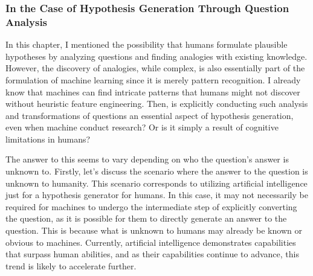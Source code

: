 \documentclass{article}
\begin{document}


\subsubsection{In the Case of Hypothesis Generation Through Question Analysis}

In this chapter, I mentioned the possibility that humans formulate plausible hypotheses by analyzing questions and finding analogies with existing knowledge. However, the discovery of analogies, while complex, is also essentially part of the formulation of machine learning since it is merely pattern recognition. I already know that machines can find intricate patterns that humans might not discover without heuristic feature engineering. Then, is explicitly conducting such analysis and transformations of questions an essential aspect of hypothesis generation, even when machine conduct research? Or is it simply a result of cognitive limitations in humans?

The answer to this seems to vary depending on who the question's answer is unknown to. Firstly, let's discuss the scenario where the answer to the question is unknown to humanity. This scenario corresponds to utilizing artificial intelligence just for a hypothesis generator for humans. In this case, it may not necessarily be required for machines to undergo the intermediate step of explicitly converting the question, as it is possible for them to directly generate an answer to the question. This is because what is unknown to humans may already be known or obvious to machines. Currently, artificial intelligence demonstrates capabilities that surpass human abilities, and as their capabilities continue to advance, this trend is likely to accelerate further.
\end{document}
